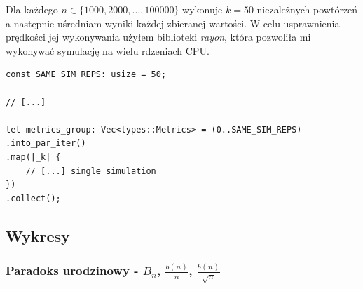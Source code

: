 \documentclass{article}
\begin{document}
Dla każdego $n\in\{1000,2000,...,100000\}$ wykonuje $k=50$ niezależnych powtórzeń a następnie uśredniam wyniki każdej zbieranej wartości. W celu usprawnienia prędkości jej wykonywania użyłem biblioteki \textit{rayon}, która pozwoliła mi wykonywać symulację na wielu rdzeniach CPU.

\begin{verbatim}
const SAME_SIM_REPS: usize = 50;

// [...]

let metrics_group: Vec<types::Metrics> = (0..SAME_SIM_REPS)
.into_par_iter()
.map(|_k| {
    // [...] single simulation
})
.collect();
\end{verbatim}

\subsection{Wykresy}

\subsubsection{Paradoks urodzinowy - $B_n$, $\frac{b(n)}{n}$, $\frac{b(n)}{\sqrt{n}}$}
\end{document}
